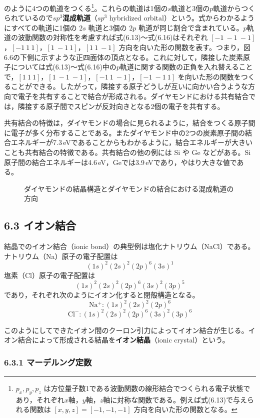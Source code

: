 \documentclass[a4paper,11pt]{ltjsarticle}
\begin{document}
のように4つの軌道をつくる\footnote{$p_x, p_y, p_z$ は方位量子数1である波動関数の線形結合でつくられる電子状態であり，それぞれ$x$軸，$y$軸，$z$軸に対称な関数である。例えば式(6.13)で与えられる関数は $[x,y,z]=[-1,-1,-1]$ 方向を向いた形の関数となる。}。これらの軌道は1個の$s$軌道と3個の$p$軌道からつくられているので\textbf{$sp^3$混成軌道}（$sp^3$ hybridized orbital）という。式からわかるようにすべての軌道に1個の $2s$ 軌道と3個の $2p$ 軌道が同じ割合で含まれている。$p$軌道の波動関数の対称性を考慮すれば式(6.13)～式(6.16)はそれぞれ $[-1\ -1\ -1]$，$[-1\ 1\ 1]$，$[1\ -1\ 1]$，$[1\ 1\ -1]$ 方向を向いた形の関数を表す。つまり，図6.6の下側に示すような正四面体の頂点となる。これに対して，隣接した炭素原子については式(6.13)～式(6.16)中の$p$軌道に関する関数の正負を入れ替えることで，$[1\ 1\ 1]$，$[1\ -1\ -1]$，$[-1\ 1\ -1]$，$[-1\ -1\ 1]$ を向いた形の関数をつくることができる。したがって，隣接する原子どうしが互いに向かい合うような方向で電子を共有することで結合が形成される。ダイヤモンドにおける共有結合では，隣接する原子間でスピンが反対向きとなる2個の電子を共有する。

共有結合の特徴は，ダイヤモンドの場合に見られるように，結合をつくる原子間に電子が多く分布することである。またダイヤモンド中の2つの炭素原子間の結合エネルギーが7.3\,eVであることからもわかるように，結合エネルギーが大きいことも共有結合の特徴である。共有結合の他の例には Si や Ge などがある。Si 原子間の結合エネルギーは4.6\,eV，Geでは3.9\,eVであり，やはり大きな値である。

\begin{figure}[h]
  \centering
  \caption{ダイヤモンドの結晶構造とダイヤモンドの結合における混成軌道の方向}
\end{figure}

\subsection{6.3 イオン結合}

結晶でのイオン結合（ionic bond）の典型例は塩化ナトリウム（NaCl）である。ナトリウム（Na）原子の電子配置は
\[
(1s)^2(2s)^2(2p)^6(3s)^1
\]
塩素（Cl）原子の電子配置は
\[
(1s)^2(2s)^2(2p)^6(3s)^2(3p)^5
\]
であり，それぞれ次のようにイオン化すると閉殻構造となる。
\[
\mathrm{Na^+}: (1s)^2(2s)^2(2p)^6
\]
\[
\mathrm{Cl^-}: (1s)^2(2s)^2(2p)^6(3s)^2(3p)^6
\]

このようにしてできたイオン間のクーロン引力によってイオン結合が生じる。イオン結合によって形成される結晶を\textbf{イオン結晶}（ionic crystal）という。

\subsubsection{6.3.1 マーデルング定数}
\end{document}
